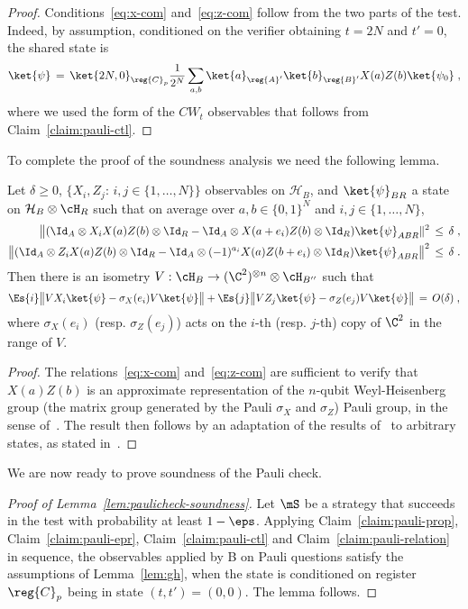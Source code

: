 \begin{proof}
Conditions~\eqref{eq:x-com} and~\eqref{eq:z-com} follow from the two parts of the test. Indeed, by assumption, conditioned on the verifier obtaining $t=2N$ and $t'=0$, the shared state is 
\[\ket{\psi} \,=\, \ket{2N,0}_{\reg{C}_p} \frac{1}{2^N}\sum_{a,b} \ket{a}_{\reg{A}'} \ket{b}_{\reg{B}'} X(a)Z(b)\ket{\psi_0}\;,\]
where we used the form of the $CW_t$ observables that follows from Claim~\ref{claim:pauli-ctl}.  
\end{proof}

To complete the proof of the soundness analysis we need the following lemma. 

\begin{lemma}\label{lem:gh}
Let $\delta\geq 0$, $\{X_i,Z_j:\, i,j\in\{1,\ldots,N\}\}$ observables on $\mathcal{H}_B$, and $\ket{\psi}_{BR}$ a state on $\mathcal{H}_B\otimes \cH_R$ such that  on average over $a,b\in\{0,1\}^N$ and $i,j\in\{1,\ldots,N\}$,
\begin{align}
\big\| (\Id_A \otimes X_i X(a) Z(b)\otimes \Id_R - \Id_A \otimes X(a+e_i)Z(b) \otimes \Id_R )\ket{\psi}_{ABR}\|^2\,\leq\,\delta\;,\label{eq:x-com-2}\\
\big\| (\Id_A \otimes Z_i X(a) Z(b)\otimes \Id_R - \Id_A \otimes (-1)^{a_i} X(a)Z(b+e_i) \otimes \Id_R )\ket{\psi}_{ABR}\big\|^2\,\leq\,\delta\;.\label{eq:z-com-2}
\end{align}
Then there is an isometry $V:\cH_B \to (\C^2)^{\otimes n} \otimes \cH_{B''}$ such that 
$$ \Es{i} \big\|  VX_i \ket{\psi} -  \sigma_X(e_i) V\ket{\psi} \big\| + \Es{j} \big\| VZ_j \ket{\psi} - \sigma_Z(e_j) V\ket{\psi} \big\| \,=\,O(\delta)\;,$$
where $\sigma_X(e_i)$ (resp. $\sigma_Z(e_j)$) acts on the $i$-th (resp. $j$-th) copy of $\C^2$ in the range of $V$. 
\end{lemma}

\begin{proof}
The relations~\eqref{eq:x-com} and~\eqref{eq:z-com} are sufficient to verify that $X(a)Z(b)$ is an approximate representation of the $n$-qubit Weyl-Heisenberg group (the matrix group generated by the Pauli $\sigma_X$ and $\sigma_Z$) Pauli group, in the sense of~\cite{gowers2017inverse}. The result then follows by an adaptation of the results of~\cite{gowers2017inverse} to arbitrary states, as stated in~\cite[Lemma 4.7]{coladangelo2017robust}.
\end{proof}

We are now ready to prove soundness of the Pauli check. 

\begin{proof}[Proof of Lemma~\ref{lem:paulicheck-soundness}]
Let $\mS$ be a strategy that succeeds in the test with probability at least $1-\eps$. Applying Claim~\ref{claim:pauli-prop}, Claim~\ref{claim:pauli-epr}, Claim~\ref{claim:pauli-ctl} and Claim~\ref{claim:pauli-relation} in sequence, the observables applied by B on Pauli questions satisfy the assumptions of Lemma~\ref{lem:gh}, when the state is conditioned on register $\reg{C}_p$ being in state $(t,t')=(0,0)$. The lemma follows. 
\end{proof}
